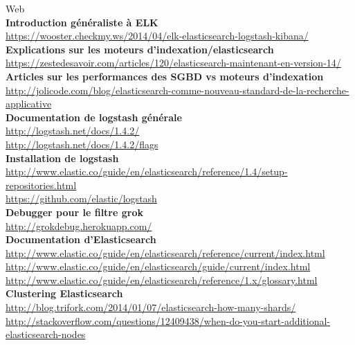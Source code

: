 {\huge Web}\\[5mm]

\textbf{Introduction généraliste à ELK} \\
\url{https://wooster.checkmy.ws/2014/04/elk-elasticsearch-logstash-kibana/}\\[1mm]

\textbf{Explications sur les moteurs d'indexation/elasticsearch}\\
\url{https://zestedesavoir.com/articles/120/elasticsearch-maintenant-en-version-14/}\\[1mm]

\textbf{Articles sur les performances des SGBD vs moteurs d'indexation}\\
{\footnotesize \url{http://jolicode.com/blog/elasticsearch-comme-nouveau-standard-de-la-recherche-applicative}}\\[1mm]

\textbf{Documentation de logstash générale}\\
\url{http://logstash.net/docs/1.4.2/}\\
\url{http://logstash.net/docs/1.4.2/flags}\\[1mm]

\textbf{Installation de logstash}\\
{\footnotesize \url{http://www.elastic.co/guide/en/elasticsearch/reference/1.4/setup-repositories.html}}\\
\url{https://github.com/elastic/logstash}\\[1mm]

\textbf{Debugger pour le filtre grok}\\
\url{http://grokdebug.herokuapp.com/}\\[1mm]

\textbf{Documentation d'Elasticsearch}\\
\url{http://www.elastic.co/guide/en/elasticsearch/reference/current/index.html}\\
\url{http://www.elastic.co/guide/en/elasticsearch/guide/current/index.html}\\
\url{http://www.elastic.co/guide/en/elasticsearch/reference/1.x/glossary.html}\\[1mm]

\textbf{Clustering Elasticsearch}\\
\url{http://blog.trifork.com/2014/01/07/elasticsearch-how-many-shards/}\\
{\footnotesize \url{http://stackoverflow.com/questions/12409438/when-do-you-start-additional-elasticsearch-nodes}}\\[1mm]

